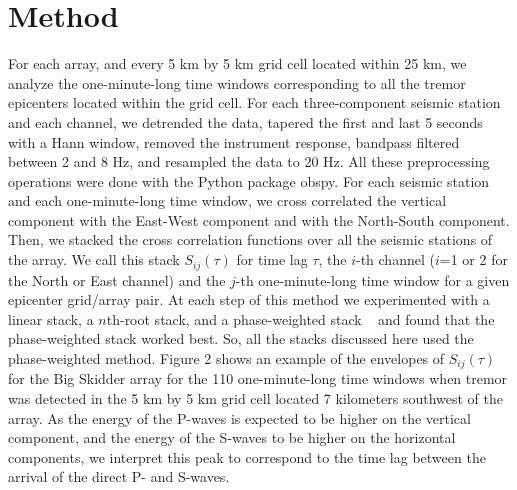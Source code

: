 \documentclass[draft]{agujournal2019}
\begin{document}
\section{Method}

For each array, and every 5 km by 5 km grid cell located within 25 km, we analyze the one-minute-long time windows corresponding to all the tremor epicenters located within the grid cell. For each three-component seismic station and each channel, we detrended the data, tapered the first and last 5 seconds with a Hann window, removed the instrument response, bandpass filtered between 2 and 8 Hz, and resampled the data to 20 Hz. All these preprocessing operations were done with the Python package obspy. For each seismic station and each one-minute-long time window, we cross correlated the vertical component with the East-West component and with the North-South component. Then, we stacked the cross correlation functions over all the seismic stations of the array. We call this stack $S_{i j} (\tau)$ for time lag $\tau$, the $i$-th channel ($i$=1 or 2 for the North or East channel) and the $j$-th one-minute-long time window for a given epicenter grid/array pair. At each step of this method we experimented with a linear stack, a $n$th-root stack, and a phase-weighted stack ~\cite{SCH_1997} and found that the phase-weighted stack worked best. So, all the stacks discussed here used the phase-weighted method.  Figure 2 shows an example of the envelopes of $S_{i j} (\tau)$ for the Big Skidder array for the 110 one-minute-long time windows when tremor was detected in the 5 km by 5 km grid cell located 7 kilometers southwest of the array. As the energy of the P-waves is expected to be higher on the vertical component, and the energy of the S-waves to be higher on the horizontal components, we interpret this peak to correspond to the time lag between the arrival of the direct P- and S-waves. \\
\end{document}
